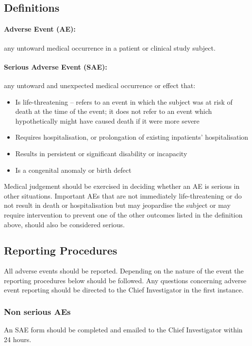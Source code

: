 \documentclass[a4paper,10pt]{article}
\begin{document}
\begin{enumerate}
\subsection{Definitions}

\paragraph{Adverse Event (AE):}any untoward medical occurrence in a patient or clinical study subject.  

\paragraph{Serious Adverse Event (SAE):}any untoward and unexpected medical occurrence or effect that: \begin{itemize}
	\item Is life-threatening – refers to an event in which the subject was at risk of death at the time of the event; it does not refer to an event which hypothetically might have caused death if it were more severe
	\item Requires hospitalisation, or prolongation of existing inpatients’ hospitalisation
    \item Results in persistent or significant disability or incapacity
	\item Is a congenital anomaly or birth defect
                                                                                              \end{itemize}


Medical judgement should be exercised in deciding whether an AE is serious in other situations. Important AEs that are not immediately life-threatening or do not result in death or hospitalisation but may jeopardise the subject or may require intervention to prevent one of the other outcomes listed in the definition above, should also be considered serious.

\subsection{Reporting Procedures}
All adverse events should be reported. Depending on the nature of the event the reporting procedures below should be followed. Any questions concerning adverse event reporting should be directed to the Chief Investigator in the first instance.  

\subsubsection{Non serious AEs}
An SAE form should be completed and emailed to the Chief Investigator within 24 hours. 


\end{enumerate}
\end{document}
